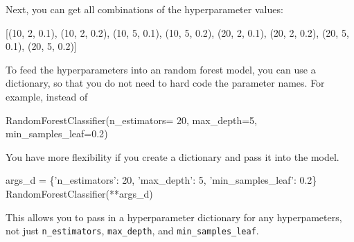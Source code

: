 \documentclass[11pt]{article}
\newenvironment{Shaded}{}{}
\newcommand{\DecValTok}[1]{\textcolor[rgb]{0.25,0.63,0.44}{{#1}}}
\newcommand{\FloatTok}[1]{\textcolor[rgb]{0.25,0.63,0.44}{{#1}}}
\newcommand{\CharTok}[1]{\textcolor[rgb]{0.25,0.44,0.63}{{#1}}}
\newcommand{\NormalTok}[1]{{#1}}
\begin{document}
Next, you can get all combinations of the hyperparameter values:

\begin{Shaded}
\begin{Highlighting}[]
\NormalTok{[(}\DecValTok{10}\NormalTok{, }\DecValTok{2}\NormalTok{, }\FloatTok{0.1}\NormalTok{),}
\NormalTok{ (}\DecValTok{10}\NormalTok{, }\DecValTok{2}\NormalTok{, }\FloatTok{0.2}\NormalTok{),}
\NormalTok{ (}\DecValTok{10}\NormalTok{, }\DecValTok{5}\NormalTok{, }\FloatTok{0.1}\NormalTok{),}
\NormalTok{ (}\DecValTok{10}\NormalTok{, }\DecValTok{5}\NormalTok{, }\FloatTok{0.2}\NormalTok{),}
\NormalTok{ (}\DecValTok{20}\NormalTok{, }\DecValTok{2}\NormalTok{, }\FloatTok{0.1}\NormalTok{),}
\NormalTok{ (}\DecValTok{20}\NormalTok{, }\DecValTok{2}\NormalTok{, }\FloatTok{0.2}\NormalTok{),}
\NormalTok{ (}\DecValTok{20}\NormalTok{, }\DecValTok{5}\NormalTok{, }\FloatTok{0.1}\NormalTok{),}
\NormalTok{ (}\DecValTok{20}\NormalTok{, }\DecValTok{5}\NormalTok{, }\FloatTok{0.2}\NormalTok{)]}
\end{Highlighting}
\end{Shaded}

To feed the hyperparameters into an random forest model, you can use a
dictionary, so that you do not need to hard code the parameter names.
For example, instead of

\begin{Shaded}
\begin{Highlighting}[]
\NormalTok{RandomForestClassifier(n_estimators= }\DecValTok{20}\NormalTok{, max_depth=}\DecValTok{5}\NormalTok{, min_samples_leaf=}\FloatTok{0.2}\NormalTok{)}
\end{Highlighting}
\end{Shaded}

You have more flexibility if you create a dictionary and pass it into
the model.

\begin{Shaded}
\begin{Highlighting}[]
\NormalTok{args_d = \{}\CharTok{'n_estimators'}\NormalTok{: }\DecValTok{20}\NormalTok{, }\CharTok{'max_depth'}\NormalTok{: }\DecValTok{5}\NormalTok{, }\CharTok{'min_samples_leaf'}\NormalTok{: }\FloatTok{0.2}\NormalTok{\}}
\NormalTok{RandomForestClassifier(**args_d)}
\end{Highlighting}
\end{Shaded}

This allows you to pass in a hyperparameter dictionary for any
hyperpameters, not just \texttt{n\_estimators}, \texttt{max\_depth}, and
\texttt{min\_samples\_leaf}.
\end{document}
